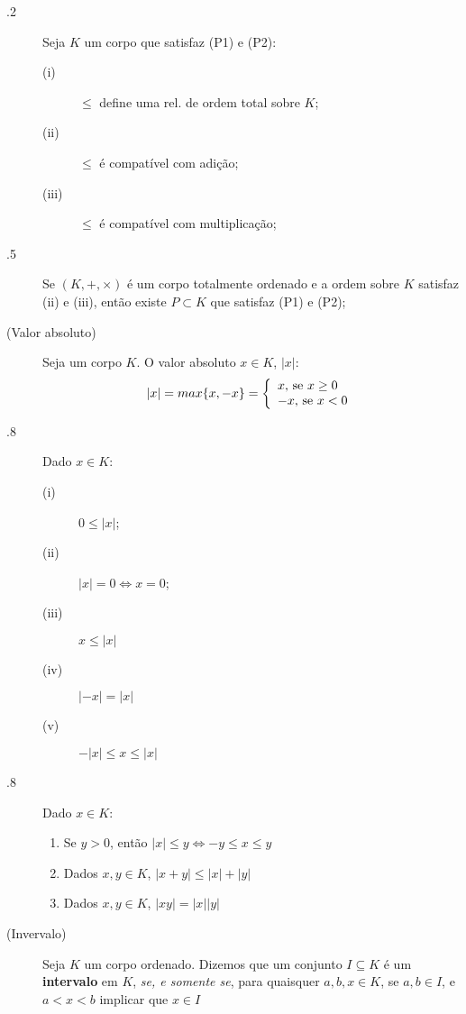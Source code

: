\documentclass[11pt]{article}
\begin{document}
\begin{description}
  \item[.2] Seja $K$ um corpo que satisfaz (P1) e (P2):
    \begin{description}
      \item[(i)] $\leq$ define uma rel. de ordem total sobre $K$;
      \item[(ii)] $\leq$ é compatível com adição;
      \item[(iii)] $\leq$ é compatível com multiplicação;
    \end{description}
  \item[.5] Se $(K, +, \times)$ é um corpo totalmente ordenado e a ordem
    sobre $K$ satisfaz (ii) e (iii), então existe $P \subset K$ que satisfaz
    (P1) e (P2);
  \item[ (Valor absoluto)] Seja um corpo $K$. O valor absoluto $x \in K$, $|x|$:
    \[ |x| = max\{x, -x\} = \left\{ 
        \begin{array}{l l}
          \text{$x$, se $x \geq 0$} \\
          \text{$-x$, se $x < 0$}
      \end{array} \right.\]
    \item[.8] Dado $x \in K$:
      \begin{multicols}{3}
        \begin{description}
          \item[(i)] $0 \leq |x|$;
          \item[(ii)] $|x| = 0 \iff x = 0$;
          \item[(iii)] $x \leq |x|$
          \item[(iv)] $|-x| = |x|$
          \item[(v)] $-|x| \leq x \leq |x|$
        \end{description}
      \end{multicols}
    \item[.8] Dado $x \in K$:
      \begin{enumerate}
        \item Se $y >0$, então $|x| \leq y \iff -y \leq x \leq y$
        \item Dados $x, y \in K$, $|x+y| \leq |x| + |y|$
        \item Dados $x, y \in K$, $|xy| = |x||y|$
      \end{enumerate}
    \item[ (Invervalo)] Seja $K$ um corpo ordenado. Dizemos que um conjunto $I
      \subseteq K$ é um \textbf{intervalo} em $K$, \emph{se, e somente se}, para
      quaisquer $a,b,x \in K$, se $a,b \in I$, e $a < x < b$ implicar que $x \in
      I$
  \end{description}
\end{document}
